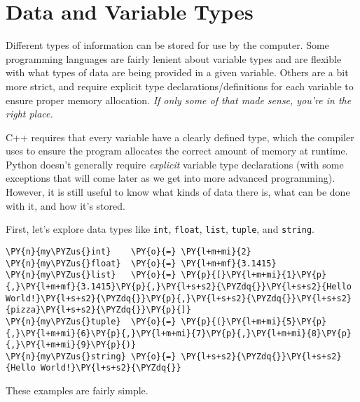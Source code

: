 \section{Data and Variable Types}
Different types of information can be stored for use by the computer. 
Some programming languages are fairly lenient about variable types and are flexible with what types of data are being provided in a given variable. 
Others are a bit more strict, and require explicit type declarations/definitions for each variable to ensure proper memory allocation. 
\emph{If only some of that made sense, you're in the right place.}

C++ requires that every variable have a clearly defined type, which the compiler uses to ensure the program allocates the correct amount of memory at runtime.
Python doesn't generally require \emph{explicit} variable type declarations (with some exceptions that will come later as we get into more advanced programming). 
However, it is still useful to know what kinds of data there is, what can be done with it, and how it's stored.

First, let's explore data types like \texttt{int}, \texttt{float},
\texttt{list}, \texttt{tuple}, and \texttt{string}.

    \begin{tcolorbox}[breakable, size=fbox, boxrule=1pt, pad at break*=1mm,colback=cellbackground, colframe=cellborder]
\begin{Verbatim}[commandchars=\\\{\}]
\PY{n}{my\PYZus{}int}    \PY{o}{=} \PY{l+m+mi}{2}
\PY{n}{my\PYZus{}float}  \PY{o}{=} \PY{l+m+mf}{3.1415}
\PY{n}{my\PYZus{}list}   \PY{o}{=} \PY{p}{[}\PY{l+m+mi}{1}\PY{p}{,}\PY{l+m+mf}{3.1415}\PY{p}{,}\PY{l+s+s2}{\PYZdq{}}\PY{l+s+s2}{Hello World!}\PY{l+s+s2}{\PYZdq{}}\PY{p}{,}\PY{l+s+s2}{\PYZdq{}}\PY{l+s+s2}{pizza}\PY{l+s+s2}{\PYZdq{}}\PY{p}{]}
\PY{n}{my\PYZus{}tuple}  \PY{o}{=} \PY{p}{(}\PY{l+m+mi}{5}\PY{p}{,}\PY{l+m+mi}{6}\PY{p}{,}\PY{l+m+mi}{7}\PY{p}{,}\PY{l+m+mi}{8}\PY{p}{,}\PY{l+m+mi}{9}\PY{p}{)}
\PY{n}{my\PYZus{}string} \PY{o}{=} \PY{l+s+s2}{\PYZdq{}}\PY{l+s+s2}{Hello World!}\PY{l+s+s2}{\PYZdq{}}
\end{Verbatim}
\end{tcolorbox}

    These examples are fairly simple.

